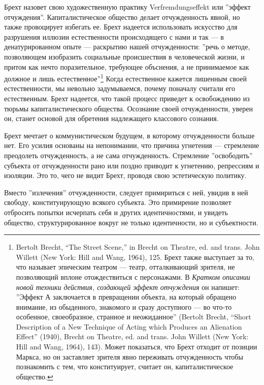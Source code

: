 \documentclass[12pt]{book}
\begin{document}
Брехт назовет свою художественную практику Verfremdungseffekt или ''эффект отчуждения''. Капиталистическое общество делает отчужденность явной, но также провоцирует избегать ее. Брехт надеется использовать искусство для разрушения иллюзии естественности происходящего с нами и так --- в денатурированном опыте --- раскрытию нашей отчужденности: ''речь о методе, позволяющем изобразить социальные происшествия в человеческой жизни, и притом как нечто поразительное, требующее объснения, а не принимаемое как должное и лишь естественное''\footnote{Bertolt Brecht, “The Street Scene,” in Brecht on Theatre, ed. and trans. John Willett (New York: Hill and Wang, 1964), 125. Брехт также выступает за то, что называет эпическим театром --- театр, отталкивающий зрителя, не позволяющий вплоне отождествиться с персонажами. В \textit{Кратком описании новой техники действия, создающей эффект отчуждения} он напишет: ''Эффект А заключается в превращении объекта, на который обращено внимание, из обыденного, знакомого и сразу доступного --- во что-то особенное, своеобразное, странное и неожиданное'' (Bertolt Brecht, “Short Description of a New Technique of Acting which Produces an Alienation Effect” (1940), Brecht on Theatre, ed. and trans. John Willett (New York: Hill and Wang, 1964), 143). Может показаться, что Брехт отходит от позиции Маркса, но он заставляет зрителя явно переживать отчужденность чтобы познакомить с тем, что конституирует, считает он, капиталистическое общество.} Когда естественное кажется лишенным своей естественности, мы невольно задумываемся, почему поначалу считали его естественным. Брехт надеется, что такой процесс приведет к освобождению из тюрьмы капиталистического общества. Осознание своей отчужденности, уверен он, станет основой для обретения надлежащего классового сознания.

Брехт мечтает о коммунистическом будущем, в которому отчужденности больше нет. Его усилия основаны на непонимании, что причина угнетения --- стремление преодолеть отчужденность, а не сама отчужденность. Стремление ''освободить'' субъекта от отчужденности рано или поздно приводит к угнетению, репрессиям и изоляции. Это то, чего не видит Брехт, проводя свою эстетическую политику.

Вместо ''излечения'' отчужденности, следует примириться с ней, увидив в ней свободу, конституирующую всякого субъекта. Это примирение позволяет отбросить попытки исчерпать себя и других идентичностями, и увидеть общество, структурированное вокруг не только идентичности, но и субъектности.
\end{document}
